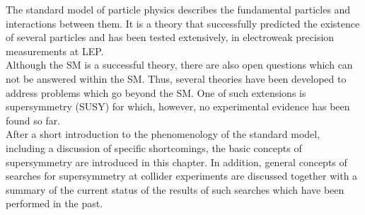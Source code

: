 The standard model of particle physics describes the fundamental particles and interactions between them. It is a theory that successfully predicted the existence of several particles and has been tested extensively, \eg in electroweak precision measurements at LEP. \\
Although the SM is a successful theory, there are also open questions which can not be answered within the SM. Thus, several theories have been developed to address problems which go beyond the SM. One of such extensions is supersymmetry (SUSY) for which, however, no experimental evidence has been found so far. \\
After a short introduction to the phenomenology of the standard model, including a discussion of specific shortcomings, the basic concepts of supersymmetry are introduced in this chapter. In addition, general concepts of searches for supersymmetry at collider experiments are discussed together with a summary of the current status of the results of such searches which have been performed in the past.
